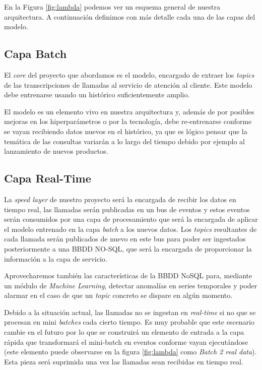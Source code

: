 En la Figura \ref{fig:lambda} podemos ver un esquema general de nuestra arquitectura. A continuación definimos con más detalle cada una de las capas del modelo.




\subsection{Capa Batch}
El \textit{core} del proyecto que abordamos es el modelo, encargado de extraer los \textit{topics} de las transcripciones de llamadas al servicio de atención al cliente. Este modelo debe entrenarse usando un histórico suficientemente amplio. 

El modelo es un elemento vivo en nuestra arquitectura y, además de por posibles mejoras en los hiperparámetros o por la tecnología, debe re-entrenarse conforme se vayan recibiendo datos nuevos en el histórico, ya que es lógico pensar que la temática de las consultas variarán a lo largo del tiempo debido por ejemplo al lanzamiento de nuevos productos. 


\subsection{Capa Real-Time}
La \textit{speed layer} de nuestro proyecto será la encargada de recibir los datos en tiempo real, las llamadas serán publicadas en un bus de eventos y estos eventos serán consumidos por una capa de procesamiento que será la encargada de aplicar el modelo entrenado en la capa \textit{batch} a los nuevos datos. Los \textit{topics} resultantes de cada llamada serán publicados de nuevo en este bus para poder ser ingestados posteriormente a una BBDD NO-SQL, que será la encargada de proporcionar la información a la capa de servicio. 

Aprovecharemos también las características de la BBDD NoSQL para, mediante un módulo de \textit{Machine Learning}, detectar anomalías en series temporales y poder alarmar en el caso de que un \textit{topic} concreto se dispare en algún momento.  

Debido a la situación actual, las llamadas no se ingestan en \textit{real-time} si no que se procesan en mini \textit{batches} cada cierto tiempo. Es muy probable que este escenario cambie en el futuro por lo que se construirá un elemento de entrada a la capa rápida que transformará el mini-batch en eventos conforme vayan ejecutándose (este elemento puede observarse en la figura \ref{fig:lambda} como \textit{Batch 2 real data}). Esta pieza será suprimida una vez las llamadas sean recibidas en tiempo real. 



